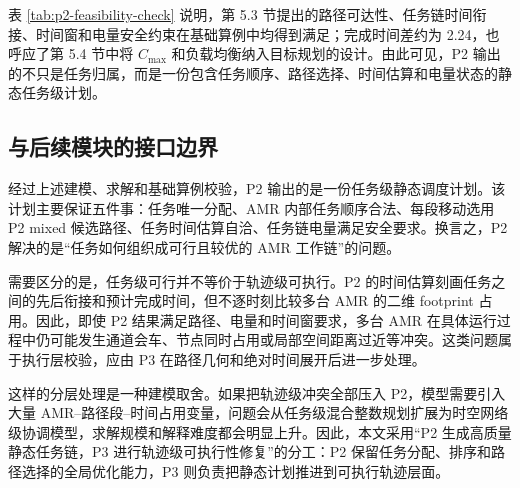 表 \ref{tab:p2-feasibility-check} 说明，第 5.3 节提出的路径可达性、任务链时间衔接、时间窗和电量安全约束在基础算例中均得到满足；完成时间差约为 2.24，也呼应了第 5.4 节中将 $C_{\max}$ 和负载均衡纳入目标规划的设计。由此可见，P2 输出的不只是任务归属，而是一份包含任务顺序、路径选择、时间估算和电量状态的静态任务级计划。

\subsection{与后续模块的接口边界}

经过上述建模、求解和基础算例校验，P2 输出的是一份任务级静态调度计划。该计划主要保证五件事：任务唯一分配、AMR 内部任务顺序合法、每段移动选用 P2 mixed 候选路径、任务时间估算自洽、任务链电量满足安全要求。换言之，P2 解决的是“任务如何组织成可行且较优的 AMR 工作链”的问题。

需要区分的是，任务级可行并不等价于轨迹级可执行。P2 的时间估算刻画任务之间的先后衔接和预计完成时间，但不逐时刻比较多台 AMR 的二维 footprint 占用。因此，即使 P2 结果满足路径、电量和时间窗要求，多台 AMR 在具体运行过程中仍可能发生通道会车、节点同时占用或局部空间距离过近等冲突。这类问题属于执行层校验，应由 P3 在路径几何和绝对时间展开后进一步处理。

这样的分层处理是一种建模取舍。如果把轨迹级冲突全部压入 P2，模型需要引入大量 AMR--路径段--时间占用变量，问题会从任务级混合整数规划扩展为时空网络级协调模型，求解规模和解释难度都会明显上升。因此，本文采用“P2 生成高质量静态任务链，P3 进行轨迹级可执行性修复”的分工：P2 保留任务分配、排序和路径选择的全局优化能力，P3 则负责把静态计划推进到可执行轨迹层面。



